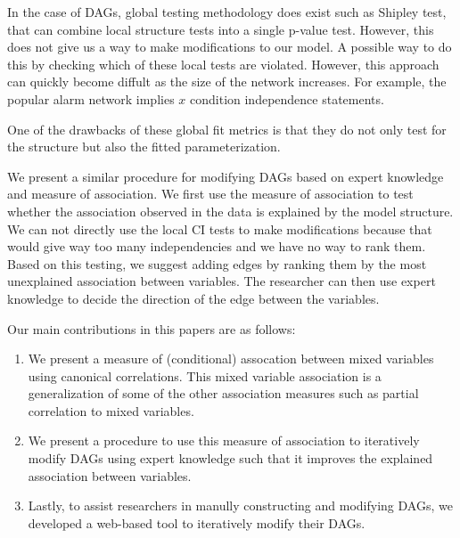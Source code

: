 \documentclass[letterpaper]{article} %
\begin{document}
In the case of DAGs, global testing methodology does exist such as Shipley
test, that can combine local structure tests into a single p-value test.
However, this does not give us a way to make modifications to our model. A
possible way to do this by checking which of these local tests are violated.
However, this approach can quickly become diffult as the size of the network
increases. For example, the popular alarm network implies $x$ condition independence
statements.

One of the drawbacks of these global fit metrics is that they do not only test
for the structure but also the fitted parameterization.

We present a similar procedure for modifying DAGs based on expert knowledge and
measure of association. We first use the measure of association to test whether
the association observed in the data is explained by the model structure. We
can not directly use the local CI tests to make modifications because that
would give way too many independencies and we have no way to rank them. Based
on this testing, we suggest adding edges by ranking them by the most
unexplained association between variables. The researcher can then use expert
knowledge to decide the direction of the edge between the variables.

Our main contributions in this papers are as follows:
\begin{enumerate}
	\item We present a measure of (conditional) assocation between mixed variables using
		canonical correlations. This mixed variable association is a generalization 
		of some of the other association measures such as partial correlation to 
		mixed variables.
	\item We present a procedure to use this measure of association to
		iteratively modify DAGs using expert knowledge such that it
		improves the explained association between variables.
	\item Lastly, to assist researchers in manully constructing and modifying DAGs,
		we developed a web-based tool to iteratively modify their DAGs.
\end{enumerate}
\end{document}
